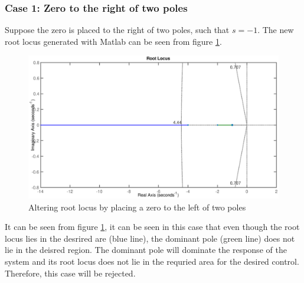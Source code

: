 \subsubsection{Case 1: Zero to the right of two poles}

Suppose the zero is placed to the right of two poles, such that $s = -1$. The new root locus generated with Matlab can be seen from figure \ref{Fig_RootLocus_ControlDesign_PD1}.
\begin{figure}[h!]
	\centering
	\includegraphics[width=\linewidth]{Bilder/RootLocus_ControlDesign_PD1.eps}
	\caption{Altering root locus by placing a zero to the left of two poles}
	\label{Fig_RootLocus_ControlDesign_PD1}
\end{figure}
\newpage
It can be seen from figure \ref{Fig_RootLocus_ControlDesign_PD1}, it can be seen in this case that even though the root locus lies in the desrired are (blue line), the dominant pole (green line) does not lie in the deisred region. The dominant pole will dominate the response of the system and its root locus does not lie in the requried area for the desired control. Therefore, this case will be rejected.

